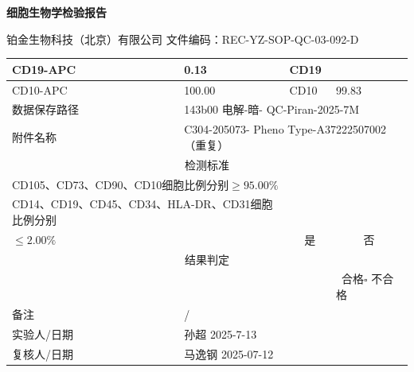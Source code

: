 \documentclass[UTF8,10pt,a4paper,fontset=fandol]{ctexart}
\newcommand{\fieldvalue}[1]{#1}
\newcommand{\handwritten}[1]{#1}
\begin{document}

\newpage

\begin{center}
\textbf{细胞生物学检验报告}
\end{center}

\noindent
铂金生物科技（北京）有限公司 \hfill 文件编码：REC-YZ-SOP-QC-03-092-D

\begin{tabularx}{\textwidth}{|p{}|X|p{}|X|}
\hline
CD19-APC &
\fieldvalue{\handwritten{0.13}} &
CD19 & \\ \hline
CD10-APC &
\fieldvalue{\handwritten{100.00}} &
CD10 &
\fieldvalue{\handwritten{99.83}} \\ \hline
\multicolumn{1}{|l|}{数据保存路径} &
\multicolumn{3}{l|}{
\fieldvalue{\handwritten{143b00 电解-暗- QC-Piran-2025-7M}}
} \\ \hline
\multicolumn{1}{|l|}{附件名称} &
\multicolumn{3}{l|}{
\fieldvalue{\handwritten{C304-205073- Pheno Type-A37222507002（重复）}}
} \\ \hline
\multicolumn{4}{|c|}{检测标准} \\ \hline
\multicolumn{4}{|l|}{CD105、CD73、CD90、CD10细胞比例分别$\geq 95.00\%$} \\ \hline
\multicolumn{2}{|l|}{CD14、CD19、CD45、CD34、HLA-DR、CD31细胞比例分别}\\
\multicolumn{2}{l|}{$\leq 2.00\%$} &
\multicolumn{1}{c|}{
\fieldvalue{\handwritten{\checkmark\ 是}}
} &
\multicolumn{1}{c|}{否} \\ \hline
\multicolumn{4}{|c|}{结果判定} \\ \hline
\multicolumn{3}{|l|}{} &
\fieldvalue{\handwritten{\checkmark\ 合格}}\quad $\square$ 不合格 \\ \hline
备注 &
\multicolumn{3}{l|}{
\fieldvalue{\handwritten{/}}
} \\ \hline
实验人/日期 &
\multicolumn{3}{l|}{
\fieldvalue{\handwritten{孙超 2025-7-13}}
} \\ \hline
复核人/日期 &
\multicolumn{3}{l|}{
\fieldvalue{\handwritten{马逸钢 2025-07-12}}
} \\ \hline
\end{tabularx}
\end{document}
